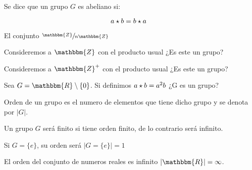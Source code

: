         \begin{definicion}
            Se dice que un grupo $G$ es abeliano si:

            \begin{equation}
                a \star b = b \star a
            \end{equation}
        \end{definicion}

        \begin{ejemplo}
            El conjunto $\sfrac{\mathbbm{Z}}{n\mathbbm{Z}}$
        \end{ejemplo} 

        \begin{ejercicio}
            Consideremos a $\mathbbm{Z}$ con el producto usual ¿Es este un grupo?
        \end{ejercicio}

        \begin{ejercicio}
            Consideremos a $\mathbbm{Z}^+$ con el producto usual ¿Es este un grupo?
        \end{ejercicio}

        \begin{ejercicio}
            Sea $G = \mathbbm{R} \setminus \{0\}$. Si definimos $a \star b = a^2 b$ ¿G es un grupo?
        \end{ejercicio}

        \begin{definicion}
            Orden de un grupo es el numero de elementos que tiene dicho grupo y se denota por $|G|$.

            Un grupo $G$ será finito si tiene orden finito, de lo contrario será infinito.
        \end{definicion}

        \begin{ejemplo}
            Si $G = \{e\}$, su orden será $\left| G = \{e\} \right| = 1$
        \end{ejemplo}

        \begin{ejemplo}
            El orden del conjunto de numeros reales es infinito $\left| \mathbbm{R} \right| = \infty$.
        \end{ejemplo}

